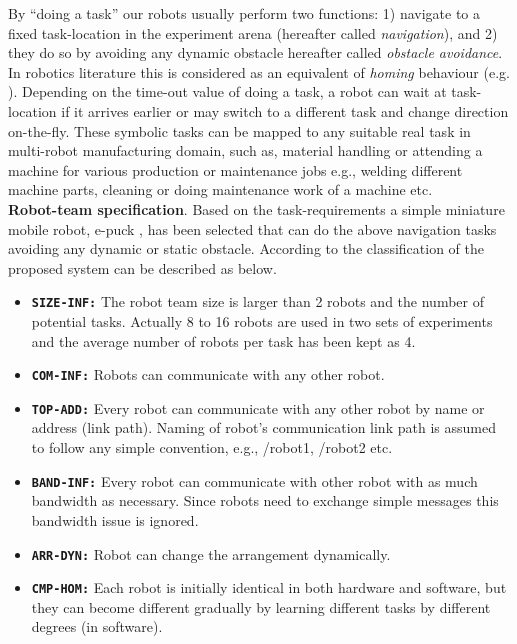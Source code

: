 By ``doing a task'' our robots usually perform two functions: 1) navigate to a fixed task-location in the experiment arena (hereafter called {\em navigation}), and 2) they do so by avoiding any dynamic obstacle {hereafter called {\em obstacle avoidance}}. In robotics literature this is considered as an equivalent of {\em homing} behaviour (e.g. ). Depending on the time-out value of doing a task, a robot can wait at task-location if it arrives earlier or may switch to a different task and change direction on-the-fly. These symbolic tasks can be mapped to any suitable real task in multi-robot manufacturing domain, such as, material handling or attending a machine for various production or maintenance jobs e.g., welding different machine parts, cleaning or doing maintenance work of a machine etc.\\
\textbf{Robot-team specification}. Based on the task-requirements a simple miniature mobile robot, e-puck \cite{Mondada+2009},  has been selected that can do the above navigation tasks avoiding any dynamic or static obstacle. According to the classification of  the proposed system can be described as below.
\begin{itemize}
\item \texttt{\textbf{SIZE-INF:}} The robot team size is larger than 2 robots and the number of potential tasks. Actually   8 to 16 robots are used in two sets of experiments and  the average number of robots per task has been kept as 4.
\item \texttt{\textbf{COM-INF:}} Robots can communicate with any other robot.
\item \texttt{\textbf{TOP-ADD:}} Every robot can communicate with any other robot by name or address (link path). Naming of robot's communication link path is assumed to follow any simple convention, e.g., /robot1, /robot2 etc.
\item \texttt{\textbf{BAND-INF:}} Every robot can communicate with other robot with as much bandwidth as necessary. Since  robots need to exchange simple messages this bandwidth issue is ignored.
\item \texttt{\textbf{ARR-DYN:}} Robot can change the arrangement dynamically.
\item \texttt{\textbf{CMP-HOM:}} Each robot is initially identical in both hardware and software, but they can become different gradually by learning different tasks by different degrees (in software).
\end{itemize}
